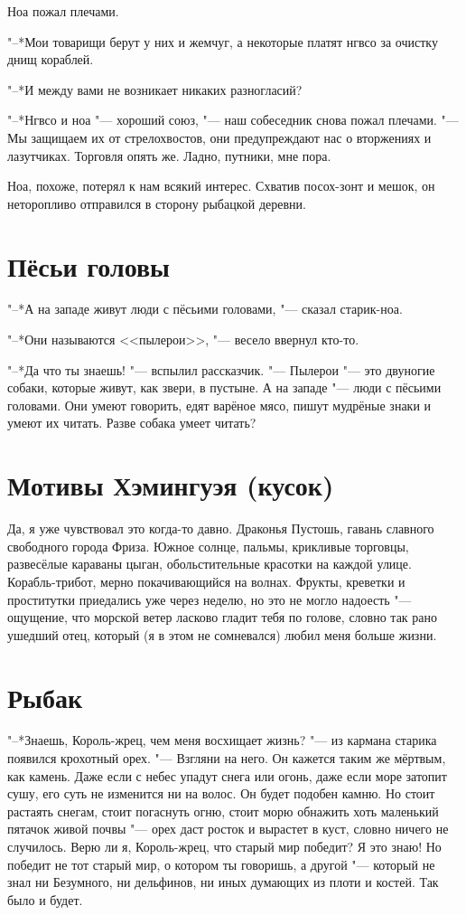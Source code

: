Ноа пожал плечами.

"--*Мои товарищи берут у них и жемчуг, а некоторые платят нгвсо за очистку днищ кораблей.

"--*И между вами не возникает никаких разногласий?

"--*Нгвсо и ноа "--- хороший союз, "--- наш собеседник снова пожал плечами.
"--- Мы защищаем их от стрелохвостов, они предупреждают нас о вторжениях и лазутчиках.
Торговля опять же.
Ладно, путники, мне пора.

Ноа, похоже, потерял к нам всякий интерес.
Схватив посох-зонт и мешок, он неторопливо отправился в сторону рыбацкой деревни.

\section{Пёсьи головы}

"--*А на западе живут люди с пёсьими головами, "--- сказал старик-ноа.

"--*Они называются <<пылерои>>, "--- весело ввернул кто-то.

"--*Да что ты знаешь! "--- вспылил рассказчик.
"--- Пылерои "--- это двуногие собаки, которые живут, как звери, в пустыне.
А на западе "--- люди с пёсьими головами.
Они умеют говорить, едят варёное мясо, пишут мудрёные знаки и умеют их читать.
Разве собака умеет читать?

\section{Мотивы Хэмингуэя (кусок)}

Да, я уже чувствовал это когда-то давно.
Драконья Пустошь, гавань славного свободного города Фриза.
Южное солнце, пальмы, крикливые торговцы, развесёлые караваны цыган, обольстительные красотки на каждой улице.
Корабль-трибот, мерно покачивающийся на волнах.
Фрукты, креветки и проститутки приедались уже через неделю, но это не могло надоесть "--- ощущение, что морской ветер ласково гладит тебя по голове, словно так рано ушедший отец, который (я в этом не сомневался) любил меня больше жизни.

\section{Рыбак}

"--*Знаешь, Король-жрец, чем меня восхищает жизнь? "--- из кармана старика появился крохотный орех.
"--- Взгляни на него.
Он кажется таким же мёртвым, как камень.
Даже если с небес упадут снега или огонь, даже если море затопит сушу, его суть не изменится ни на волос.
Он будет подобен камню.
Но стоит растаять снегам, стоит погаснуть огню, стоит морю обнажить хоть маленький пятачок живой почвы "--- орех даст росток и вырастет в куст, словно ничего не случилось.
Верю ли я, Король-жрец, что старый мир победит?
Я это знаю!
Но победит не тот старый мир, о котором ты говоришь, а другой "--- который не знал ни Безумного, ни дельфинов, ни иных думающих из плоти и костей.
Так было и будет.

